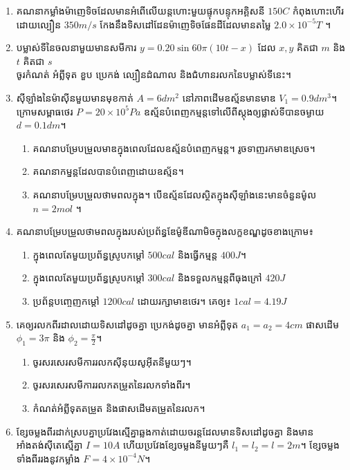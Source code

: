 \documentclass{officialexam}
\begin{document}
\begin{enumerate}[I]
	\item គណនាកម្លាំងម៉ាញេទិចដែលមានអំពើលើយន្តហោះមួយផ្ទុកបន្ទុកអគ្គិសនី $150C$ កំពុងហោះហើរដោយល្បឿន $350m/s$ កែងនឹងទិសដៅដែនម៉ាញេទិចផែនដីដែលមានតម្លៃ $2.0\times10^{-5}T$ ។
	\item បម្លាស់ទីនៃចលនាមួយមានសមីការ $y=0.20\sin60\pi\left(10t-x\right)$ ដែល $x, y$ គិតជា $m$ និង $t$ គិតជា $s$\\
	ចូរកំណត់ អំព្លីទុត ខួប ប្រេកង់ ល្បឿនដំណាល និងជំហានរលកនៃបម្លាស់ទីនេះ។
	\item សុីឡាំងនៃម៉ាសុីនមួយមានមុខកាត់ $A=6dm^2$ នៅភាពដើមឧស្ម័នមានមាឌ $V_1=0.9dm^3$។ \\ក្រោមសម្ពាធថេរ $P=20\times10^5Pa$ ឧស្ម័នបំពេញកម្មន្តទៅលើពីស្តុងឲ្យផ្លាស់ទីបានចម្ងាយ $d=0.1dm$។
	\begin{enumerate}[k]
		\item គណនាបម្រែបម្រួលមាឌក្នុងពេលដែលឧស្ម័នបំពេញកម្មន្ត។ រូចទាញរកមាឌស្រេច។
		\item គណនាកម្នន្តដែលបានបំពេញដោយឧស្ម័ន។
		\item គណនាបម្រែបម្រួលថាមពលក្នុង។ បើឧស្ម័នដែលស្ថិតក្នុងសុីឡាំងនេះមានចំនួនម៉ូល $n=2mol$ ។
	\end{enumerate} 
	\item គណនាបម្រែបម្រួលថាមពលក្នុងរបស់ប្រព័ន្ធឌែម៉ូឌីណាមិចក្នុងលក្ខខណ្ឌដូចខាងក្រោម៖
	\begin{enumerate}[k]
		\item ក្នុងពេលតែមួយប្រព័ន្ធស្រូបកម្តៅ $500cal$ និងធ្វើកម្មន្ត $400J$។
		\item ក្នុងពេលតែមួយប្រព័ន្ធស្រូបកម្តៅ $300cal$ និងទទួលកម្មន្តពីធុងក្រៅ $420J$
		\item ប្រព័ន្តបញ្ចេញកម្តៅ $1200cal$ ដោយរក្សាមាឌថេរ។ គេឲ្យ៖ $1cal=4.19J$
	\end{enumerate}
	\item គេឲ្យរលកពីរដាលដោយទិសដៅដូចគ្នា ប្រេកង់ដូចគ្នា មានអំព្លីទុត $a_1=a_2=4cm$ ផាសដើម $\phi_1=3\pi$ និង $\phi_2=\frac{\pi}{2}$។
	\begin{enumerate}[k]
		\item ចូរសរសេរសមីការរលកសុីនុយសូអុីតនីមួយៗ។
		\item ចូរសរសេរសមីការរលកតម្រួតនៃរលកទាំងពីរ។
		\item កំណត់អំព្លីទុតតម្រួត និងផាសដើមតម្រួតនៃរលក។
	\end{enumerate}
	\item ខ្សែចម្លងពីរដាក់ស្របគ្នាប្រវែងស្មើគ្នាឆ្លងកាត់ដោយចរន្តដែលមានទិសដៅដូចគ្នា និងមានអាំងតង់សុីតេស្មើគ្នា $I=10A$ ហើយប្រវែងខ្សែចម្លងនីមួយៗគឺ $l_1=l_2=l=2m$។ ខ្សែចម្លងទាំងពីររងនូវកម្លាំង $F=4\times10^{-4}N$។

\end{enumerate}
\end{document}
